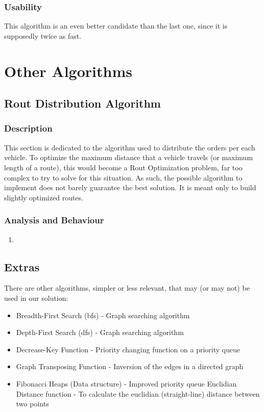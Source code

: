 \subsubsection{Usability}
This algorithm is an even better candidate than the last one, since it is supposedly twice as fast. 


\newpage
\section{Other Algorithms}


\subsection{Rout Distribution Algorithm}

\subsubsection{Description}
This section is dedicated to the algorithm used to distribute the orders per each vehicle. To optimize the maximum distance that a vehicle travels (or maximum length of a route), this would become a Rout Optimization problem, far too complex to try to solve for this situation. As such, the possible algorithm to implement does not barely guarantee the best solution. It is meant only to build slightly optimized routes.

\subsubsection{Analysis and Behaviour}
\begin{enumerate}
    \item 
\end{enumerate}

\subsection{Extras}
There are other algorithms, simpler or less relevant, that may (or may not) be used in our solution:
\begin{itemize}
    \item Breadth-First Search (bfs) - Graph searching algorithm
    \item Depth-First Search (dfs) - Graph searching algorithm
    \item Decrease-Key Function - Priority changing function on a priority queue
    \item Graph Transposing Function - Inversion of the edges in a directed graph
    \item Fibonacci Heaps (Data structure) - Improved priority queue
    \irem Euclidian Distance function - To calculate the euclidian (straight-line) distance between two points
\end{itemize}
